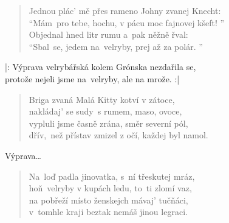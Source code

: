 \begin{song}{}
\begin{verse}
   Jednou plác' mě přes rameno Johny zvanej Knecht: \\
   \enquote{Mám~pro tebe, hochu, v pácu moc fajnovej kšeft! } \\
   Objednal hned litr rumu a~pak něžně řval: \\
   \enquote{Sbal~se, jedem na~velryby, prej až za polár. }
\end{verse}
\begin{refren}
   |: Výprava velrybářská kolem Grónska nezdařila se, \\
      protože nejeli jsme na~velryby, ale na mrože. :|
\end{refren}
\begin{verse}
   Briga zvaná Malá Kitty kotví v zátoce, \\
   nakládaj' se sudy~s rumem, maso, ovoce, \\
   vypluli jsme časně zrána, směr severní pól, \\
   dřív,~než přístav zmizel z očí, každej byl namol.
\end{verse}
\begin{refren}
   Výprava\ldots
\end{refren}
\begin{verse}
   Na~loď padla jinovatka, s~ní třeskutej mráz, \\
   hoň~velryby v kupách ledu, to~ti zlomí vaz, \\
   na pobřeží místo ženskejch mávaj' tučňáci, \\
   v~tomhle kraji beztak nemáš jinou legraci.
\end{verse}

\chordbreak
\compactbreak

\begin{refren}


\end{refren}
\end{song}
